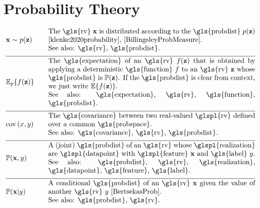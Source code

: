 \section*{Probability Theory} 
\begin{align}
	&\featurevec \sim p(\vz)  &\quad & \parbox{.85\textwidth}{The \gls{rv} $\featurevec$ is distributed according to 
		the \gls{probdist} $p(\vz)$ \cite{klenke2020probability}, \cite{BillingsleyProbMeasure}.
		\\ See also: \gls{rv}, \gls{probdist}.}  \nonumber \\[2mm] \hline \nonumber\\[-5mm]  
	&\expect_{p} \{ f(\datapoint) \}  &\quad & \parbox{.85\textwidth}{The \gls{expectation} of an \gls{rv} $f(\datapoint)$ that 
		is obtained by applying a deterministic \gls{function} $f$ to an \gls{rv}
		$\datapoint$ whose \gls{probdist} is $\prob{\datapoint}$. If the \gls{probdist} is clear from context, 
		we just write $\expect \{ f(\datapoint) \}$. 
		\\ See also: \gls{expectation}, \gls{rv}, \gls{function}, \gls{probdist}.}  \nonumber \\[2mm] \hline \nonumber\\[-5mm]
	&\cov{x}{y} &\quad & \parbox{.85\textwidth}{The \gls{covariance} between two real-valued \glspl{rv} defined 
		over a common \gls{probspace}. 
		\\ See also: \gls{covariance}, \gls{rv}, \gls{probdist}.}  \nonumber \\[2mm] \hline \nonumber\\[-5mm]
	&\prob{\featurevec,\truelabel} &\quad & \parbox{.85\textwidth}{A (joint) \gls{probdist} of an \gls{rv} 
		whose \glspl{realization} are \glspl{datapoint} with \glspl{feature} $\featurevec$ and \gls{label} $\truelabel$.
		\\ See also: \gls{probdist}, \gls{rv}, \gls{realization}, \gls{datapoint}, \gls{feature}, 
		\gls{label}.} \nonumber \\[2mm] \hline \nonumber\\[-5mm]
	&\prob{\featurevec|\truelabel} &\quad & \parbox{.85\textwidth}{A conditional \gls{probdist} of an \gls{rv} 
		$\featurevec$ given the value of another \gls{rv} $\truelabel$ \cite[Sec.\ 3.5]{BertsekasProb}. 
		\\ See also: \gls{probdist}, \gls{rv}. } \nonumber 
\end{align} 
\newpage
